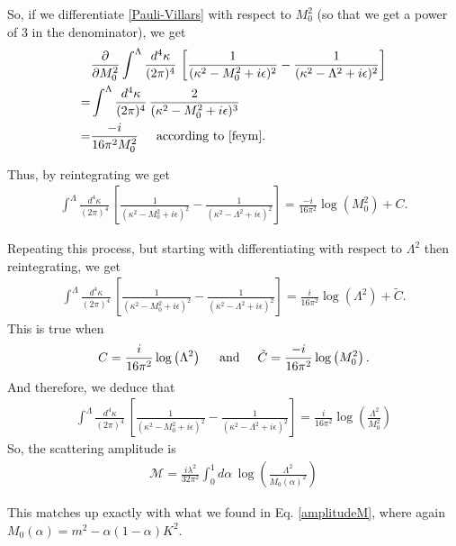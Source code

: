 \documentclass{book}
\theoremstyle{definition}
\newcommand{\p}{\partial}
\newcommand{\f}[2]{\frac{#1}{#2}}
\newcommand{\lp}{\left(}
\newcommand{\rp}{\right)}
\newcommand{\lb}{\left[}
\newcommand{\rb}{\right]}
\begin{document}
So, if we differentiate \eqref{Pauli-Villars} with respect to $M_0^2$ (so that we get a power of 3 in the denominator), we get
\begin{align}
&\f{\p}{\p M_0^2} \int^\Lambda \f{d^4\kappa}{(2\pi)^4}   \, \lb\f{1}{(\kappa^2 - M_0^2 + i\epsilon )^2} - \f{1}{(\kappa^2 - \Lambda^2 + i\epsilon)^2}\rb \nonumber\\
= &\int^\Lambda \f{d^4\kappa}{(2\pi)^4}   \, \f{2}{(\kappa^2 - M_0^2 + i\epsilon )^3} \nonumber\\
= &\f{-i}{16\pi^2 M_0^2} \hspace{0.5cm} \text{according to \eqref{feym}}. 
\end{align}

Thus, by reintegrating we get
\begin{align}
\int^\Lambda \f{d^4\kappa}{(2\pi)^4}   \, \lb\f{1}{(\kappa^2 - M_0^2 + i\epsilon )^2} - \f{1}{(\kappa^2 - \Lambda^2 + i\epsilon)^2}\rb = \f{-i}{16\pi^2}\log\lp M_0^2\rp + C.
\end{align}

Repeating this process, but starting with differentiating with respect to $\Lambda^2$ then reintegrating, we get
\begin{align}
\int^\Lambda \f{d^4\kappa}{(2\pi)^4}   \, \lb\f{1}{(\kappa^2 - M_0^2 + i\epsilon )^2} - \f{1}{(\kappa^2 - \Lambda^2 + i\epsilon)^2}\rb = \f{i}{16\pi^2}\log\lp \Lambda^2\rp + \tilde{C}.
\end{align}
This is true when
\begin{align}
C = \f{i}{16\pi^2}\log\lp \Lambda^2\rp \hspace{0.5cm}\text{and}\hspace{0.5cm} \tilde{C} = \f{-i}{16\pi^2}\log\lp M_0^2\rp.
\end{align}
And therefore, we deduce that
\begin{align}
\boxed{\int^\Lambda \f{d^4\kappa}{(2\pi)^4}   \, \lb\f{1}{(\kappa^2 - M_0^2 + i\epsilon )^2} - \f{1}{(\kappa^2 - \Lambda^2 + i\epsilon)^2}\rb = \f{i}{16\pi^2}\log\lp \f{\Lambda^2}{M_0^2} \rp}
\end{align}
So, the scattering amplitude is
\begin{align}
\boxed{\mathcal{M} = \f{i\lambda^2}{32\pi^2}\int^1_0 d\alpha\, \log\lp \f{\Lambda^2}{M_0(\alpha)^2} \rp }
\end{align}

This matches up exactly with what we found in Eq. \eqref{amplitudeM}, where again $M_0(\alpha) = m^2- \alpha(1-\alpha)K^2$.
\end{document}
